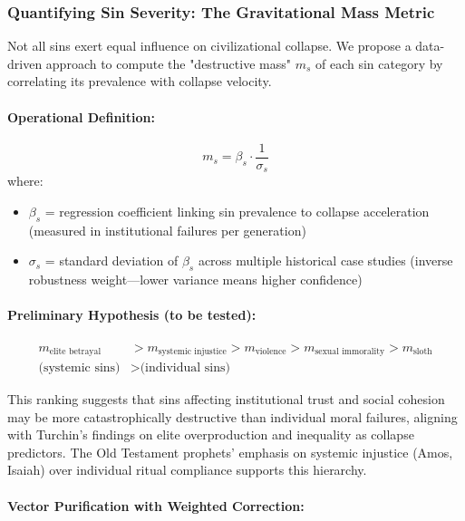 \documentclass[11pt,a4paper]{article}
\theoremstyle{definition}
\theoremstyle{remark}
\begin{document}
\subsubsection{Quantifying Sin Severity: The Gravitational Mass Metric}

Not all sins exert equal influence on civilizational collapse. We propose a data-driven approach to compute the "destructive mass" \(m_s\) of each sin category by correlating its prevalence with collapse velocity.

\paragraph{Operational Definition:}
\begin{equation}
m_s = \beta_s \cdot \frac{1}{\sigma_s}
\end{equation}
where:
\begin{itemize}
    \item \(\beta_s\) = regression coefficient linking sin prevalence to collapse acceleration (measured in institutional failures per generation)
    \item \(\sigma_s\) = standard deviation of \(\beta_s\) across multiple historical case studies (inverse robustness weight—lower variance means higher confidence)
\end{itemize}

\paragraph{Preliminary Hypothesis (to be tested):}
\begin{align}
m_{\text{elite betrayal}} &> m_{\text{systemic injustice}} > m_{\text{violence}} > m_{\text{sexual immorality}} > m_{\text{sloth}} \\
\text{(systemic sins)} &> \text{(individual sins)}
\end{align}

This ranking suggests that sins affecting institutional trust and social cohesion may be more catastrophically destructive than individual moral failures, aligning with Turchin's findings on elite overproduction and inequality as collapse predictors. The Old Testament prophets' emphasis on systemic injustice (Amos, Isaiah) over individual ritual compliance supports this hierarchy.

\paragraph{Vector Purification with Weighted Correction:}
\end{document}
